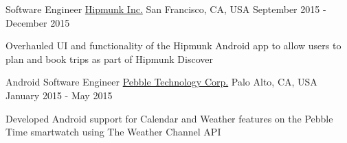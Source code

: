 \begin{center}
  \vspace{-2.7mm}
  \cventry
    {Software Engineer}
    {\href{https://hipmunk.com/mobile}{Hipmunk Inc.}}
    {San Francisco, CA, USA}
    {September 2015 - December 2015}
    {
      \begin{cvitems}
        \item {Overhauled UI and functionality of the Hipmunk Android app to allow users to plan and book trips as part of Hipmunk Discover}
      \end{cvitems}
    }
\end{center}
\begin{center}
  \vspace{-2.7mm}
  \cventry
    {Android Software Engineer}
    {\href{https://pebble.com/apps}{Pebble Technology Corp.}}
    {Palo Alto, CA, USA}
    {January 2015 - May 2015}
    {
      \begin{cvitems}
        \item {Developed Android support for Calendar and Weather features on the Pebble Time smartwatch using The Weather Channel API}
      \end{cvitems}
    }
\end{center}
